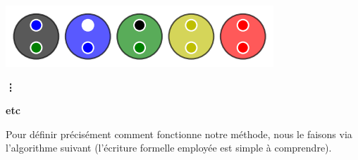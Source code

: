 \begin{multicols}{2}
\begin{center}
        \includegraphics[scale= 0.45]{content/algo_selection/example/014.png}

        \textbf{\vdots}

        \textbf{etc}
    \end{center}
\end{multicols}


\medskip

Pour définir précisément comment fonctionne notre méthode, nous le faisons via l'algorithme suivant (l'écriture formelle employée est simple à comprendre).

\bigskip

